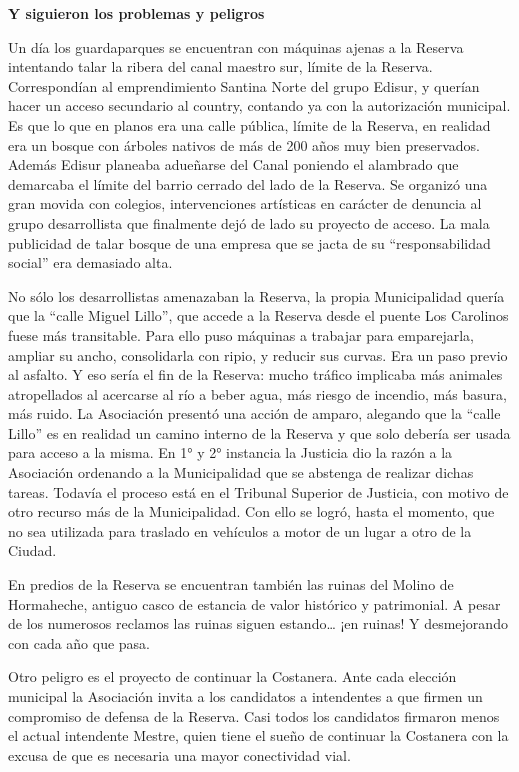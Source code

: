 \begin{fullwidth}
\textbf{Y siguieron los problemas y peligros}

Un día los guardaparques se encuentran con máquinas ajenas a la Reserva
intentando talar la ribera del canal maestro sur, límite de la Reserva.
Correspondían al emprendimiento Santina Norte del grupo Edisur, y
querían hacer un acceso secundario al country, contando ya con la
autorización municipal. Es que lo que en planos era una calle pública,
límite de la Reserva, en realidad era un bosque con árboles nativos de
más de 200 años muy bien preservados. Además Edisur planeaba adueñarse
del Canal poniendo el alambrado que demarcaba el límite del barrio
cerrado del lado de la Reserva. Se organizó una gran movida con
colegios, intervenciones artísticas en carácter de denuncia al grupo
desarrollista que finalmente dejó de lado su proyecto de acceso. La mala
publicidad de talar bosque de una empresa que se jacta de su
``responsabilidad social'' era demasiado alta.

No sólo los desarrollistas amenazaban la Reserva, la propia
Municipalidad quería que la ``calle Miguel Lillo'', que accede a la
Reserva desde el puente Los Carolinos fuese más transitable. Para ello
puso máquinas a trabajar para emparejarla, ampliar su ancho,
consolidarla con ripio, y reducir sus curvas. Era un paso previo al
asfalto. Y eso sería el fin de la Reserva: mucho tráfico implicaba más
animales atropellados al acercarse al río a beber agua, más riesgo de
incendio, más basura, más ruido. La Asociación presentó una acción de
amparo, alegando que la ``calle Lillo'' es en realidad un camino interno
de la Reserva y que solo debería ser usada para acceso a la misma. En 1°
y 2° instancia la Justicia dio la razón a la Asociación ordenando a la
Municipalidad que se abstenga de realizar dichas tareas. Todavía el
proceso está en el Tribunal Superior de Justicia, con motivo de otro
recurso más de la Municipalidad. Con ello se logró, hasta el momento,
que no sea utilizada para traslado en vehículos a motor de un lugar a
otro de la Ciudad.

En predios de la Reserva se encuentran también las ruinas del Molino de
Hormaheche, antiguo casco de estancia de valor histórico y patrimonial.
A pesar de los numerosos reclamos las ruinas siguen estando\ldots{} ¡en
ruinas! Y desmejorando con cada año que pasa.

Otro peligro es el proyecto de continuar la Costanera. Ante cada
elección municipal la Asociación invita a los candidatos a intendentes a
que firmen un compromiso de defensa de la Reserva. Casi todos los
candidatos firmaron menos el actual intendente Mestre, quien tiene el
sueño de continuar la Costanera con la excusa de que es necesaria una
mayor conectividad vial.


\end{fullwidth}
